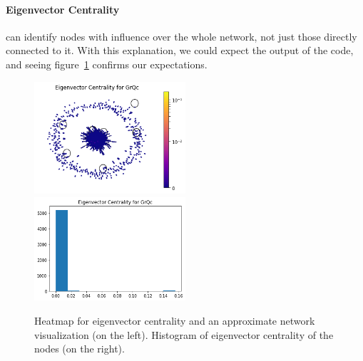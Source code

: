 \documentclass[letterpaper, 11pt]{article}
\newcommand{\1}{\mathds{1}}	%
\theoremstyle{definition}
\begin{document}
\paragraph{Eigenvector Centrality}can identify nodes with influence over the whole network, not just those directly connected to it. With this explanation, we could expect the output of the code, and seeing figure~\ref{fig:e_cent} confirms our expectations.
\begin{figure}[h]
\includegraphics[width=0.5\textwidth]{GrQc_e_cent.png}
\includegraphics[width=0.5\textwidth]{GrQc_e_cent_hist.png}
\captionsetup{justification=centering,margin=0.5cm}
\caption{Heatmap for eigenvector centrality and an approximate network visualization (on the left). Histogram of eigenvector centrality of the nodes (on the right).}
\label{fig:e_cent}
\end{figure}
\end{document}

